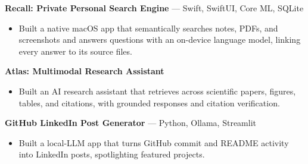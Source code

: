 \documentclass[a4paper,8pt]{extarticle}
\begin{document}
\noindent
\textbf{Recall: Private Personal Search Engine} --- Swift, SwiftUI, Core ML, SQLite

\begin{itemize}
\item Built a native macOS app that semantically searches notes, PDFs, and screenshots and answers questions with an on-device language model, linking every answer to its source files.
\end{itemize}

\noindent
\textbf{Atlas: Multimodal Research Assistant}

\begin{itemize}
\item Built an AI research assistant that retrieves across scientific papers, figures, tables, and citations, with grounded responses and citation verification.
\end{itemize}

\noindent
\textbf{GitHub LinkedIn Post Generator} --- Python, Ollama, Streamlit

\begin{itemize}
\item Built a local-LLM app that turns GitHub commit and README activity into LinkedIn posts, spotlighting featured projects.
\end{itemize}
\end{document}
